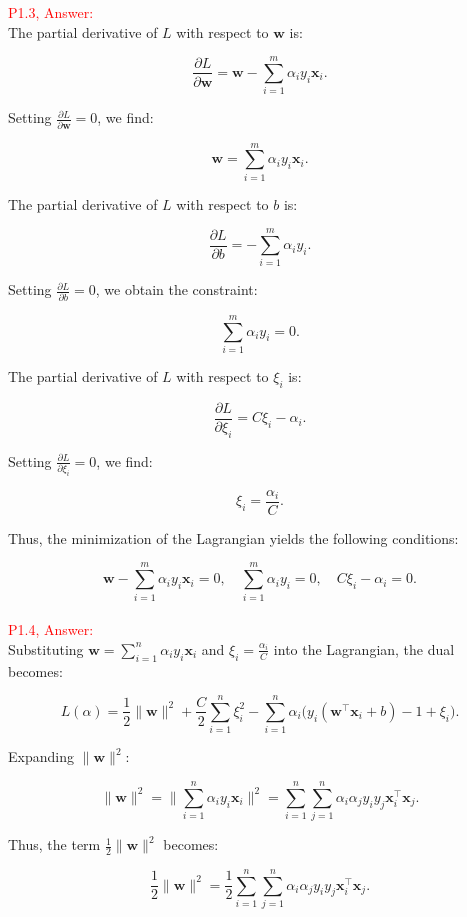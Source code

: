 \documentclass[11pt]{article}
\begin{document}
\textcolor{red}{P1.3, Answer:}\\

The partial derivative of \( L \) with respect to \( \mathbf{w} \) is:

\[
\frac{\partial L}{\partial \mathbf{w}} = \mathbf{w} - \sum_{i=1}^m \alpha_i y_i \mathbf{x}_i.
\]

Setting \( \frac{\partial L}{\partial \mathbf{w}} = 0 \), we find:

\[
\mathbf{w} = \sum_{i=1}^m \alpha_i y_i \mathbf{x}_i.
\]

The partial derivative of \( L \) with respect to \( b \) is:

\[
\frac{\partial L}{\partial b} = -\sum_{i=1}^m \alpha_i y_i.
\]

Setting \( \frac{\partial L}{\partial b} = 0 \), we obtain the constraint:

\[
\sum_{i=1}^m \alpha_i y_i = 0.
\]

The partial derivative of \( L \) with respect to \( \xi_i \) is:

\[
\frac{\partial L}{\partial \xi_i} = C \xi_i - \alpha_i.
\]

Setting \( \frac{\partial L}{\partial \xi_i} = 0 \), we find:

\[
\xi_i = \frac{\alpha_i}{C}.
\]

Thus, the minimization of the Lagrangian yields the following conditions:

\[
\mathbf{w} - \sum_{i=1}^m \alpha_i y_i \mathbf{x}_i = 0, \quad \sum_{i=1}^m \alpha_i y_i = 0, \quad C\xi_i - \alpha_i = 0.
\]\\


\textcolor{red}{P1.4, Answer:}\\


Substituting \( \mathbf{w} = \sum_{i=1}^n \alpha_i y_i \mathbf{x}_i \) and \( \xi_i = \frac{\alpha_i}{C} \) into the Lagrangian, the dual becomes:

\[
L(\alpha) = \frac{1}{2} \|\mathbf{w}\|^2 + \frac{C}{2} \sum_{i=1}^n \xi_i^2 - \sum_{i=1}^n \alpha_i \big( y_i (\mathbf{w}^\top \mathbf{x}_i + b) - 1 + \xi_i \big).
\]

Expanding \( \|\mathbf{w}\|^2 \):

\[
\|\mathbf{w}\|^2 = \Bigg\|\sum_{i=1}^n \alpha_i y_i \mathbf{x}_i \Bigg\|^2 = \sum_{i=1}^n \sum_{j=1}^n \alpha_i \alpha_j y_i y_j \mathbf{x}_i^\top \mathbf{x}_j.
\]

Thus, the term \( \frac{1}{2} \|\mathbf{w}\|^2 \) becomes:

\[
\frac{1}{2} \|\mathbf{w}\|^2 = \frac{1}{2} \sum_{i=1}^n \sum_{j=1}^n \alpha_i \alpha_j y_i y_j \mathbf{x}_i^\top \mathbf{x}_j.
\]
\end{document}
